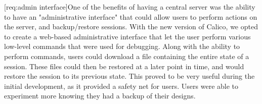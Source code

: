 [req:admin interface]One of the benefits of having a central server was the ability to have an "administrative interface" that could allow users to perform actions on the server, and backup/restore sessions. With the new version of Calico, we opted to create a web-based administrative interface that let the user perform various low-level commands that were used for debugging. Along with the ability to perform commands, users could download a file containing the entire state of a session. These files could then be restored at a later point in time, and would restore the session to its previous state. This proved to be very useful during the initial development, as it provided a safety net for users. Users were able to experiment more knowing they had a backup of their designs.
